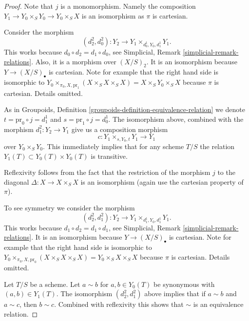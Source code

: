 \documentclass{stacks-project}
\theoremstyle{plain}
\theoremstyle{definition}
\theoremstyle{remark}
\numberwithin{equation}{subsection}
\begin{document}
\begin{proof}
Note that $j$ is a monomorphism. Namely the
composition $Y_1 \to Y_0 \times_S Y_0 \to Y_0 \times_S X$
is an isomorphism as $\pi$ is cartesian.

\medskip\noindent
Consider the morphism
$$
(d^2_2, d^2_0) : Y_2 \to Y_1 \times_{d^1_0, Y_0, d^1_1} Y_1.
$$
This works because $d_0 \circ d_2 = d_1 \circ d_0$,
see Simplicial, Remark \ref{simplicial-remark-relations}.
Also, it is a morphism over $(X/S)_2$. It is an isomorphism
because $Y \to (X/S)_\bullet$ is cartesian. Note for example that the
right hand side is isomorphic to
$Y_0 \times_{\pi_0, X, \text{pr}_1} (X \times_S X \times_S X) =
X \times_S Y_0 \times_S X$
because $\pi$ is cartesian. Details omitted.

\medskip\noindent
As in Groupoids, Definition \ref{groupoids-definition-equivalence-relation}
we denote $t = \text{pr}_0 \circ j = d^1_1$ and
$s = \text{pr}_1 \circ j = d^1_0$.
The isomorphism above, combined with the morphism
$d^2_1 : Y_2 \to Y_1$ give us a composition morphism
$$
c : Y_1 \times_{s, Y_0, t} Y_1 \longrightarrow Y_1
$$
over $Y_0 \times_S Y_0$. This immediately implies
that for any scheme $T/S$ the relation
$Y_1(T) \subset Y_0(T) \times Y_0(T)$ is transitive.

\medskip\noindent
Reflexivity follows from the fact that the
restriction of the morphism $j$ to the diagonal
$\Delta : X \to X \times_S X$ is an isomorphism
(again use the cartesian property of $\pi$).

\medskip\noindent
To see symmetry we consider the morphism
$$
(d^2_2, d^2_1) : Y_2 \to Y_1 \times_{d^1_1, Y_0, d^1_1} Y_1.
$$
This works because $d_1 \circ d_2 = d_1 \circ d_1$,
see Simplicial, Remark \ref{simplicial-remark-relations}.
It is an isomorphism
because $Y \to (X/S)_\bullet$ is cartesian.
Note for example that the
right hand side is isomorphic to
$Y_0 \times_{\pi_0, X, \text{pr}_0} (X \times_S X \times_S X) =
Y_0 \times_S X \times_S X$
because $\pi$ is cartesian. Details omitted.

\medskip\noindent
Let $T/S$ be a scheme. Let $a \sim b$ for $a, b \in Y_0(T)$
be synonymous with $(a, b) \in Y_1(T)$.
The isomorphism $(d^2_2, d^2_1)$ above
implies that if $a \sim b$ and $a \sim c$, then $b \sim c$.
Combined with reflexivity this shows that $\sim$ is
an equivalence relation.
\end{proof}
\end{document}
